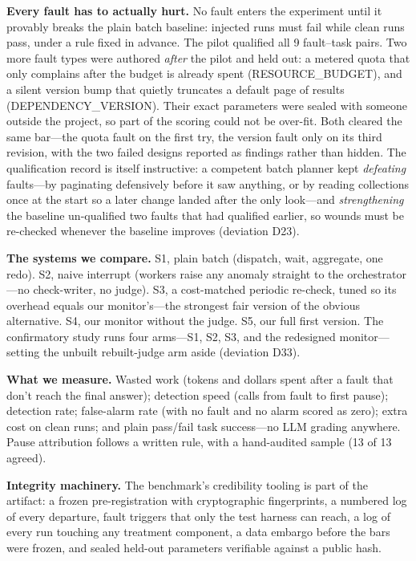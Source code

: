 \documentclass[acmsmall,screen]{acmart}
\begin{document}
\textbf{Every fault has to actually hurt.} No fault enters the experiment until
it provably breaks the plain batch baseline: injected runs must fail while clean
runs pass, under a rule fixed in advance. The pilot qualified all 9 fault--task
pairs. Two more fault types were authored \emph{after} the pilot and held out: a
metered quota that only complains after the budget is already spent
(RESOURCE\_BUDGET), and a silent version bump that quietly truncates a default
page of results (DEPENDENCY\_VERSION). Their exact parameters were sealed with
someone outside the project, so part of the scoring could not be over-fit. Both
cleared the same bar---the quota fault on the first try, the version fault only
on its third revision, with the two failed designs reported as findings rather
than hidden. The qualification record is itself instructive: a competent batch
planner kept \emph{defeating} faults---by paginating defensively before it saw
anything, or by reading collections once at the start so a later change landed
after the only look---and \emph{strengthening} the baseline un-qualified two
faults that had qualified earlier, so wounds must be re-checked whenever the
baseline improves (deviation D23).

\textbf{The systems we compare.} S1, plain batch (dispatch, wait, aggregate,
one redo). S2, naive interrupt (workers raise any anomaly straight to the
orchestrator---no check-writer, no judge). S3, a cost-matched periodic
re-check, tuned so its overhead equals our monitor's---the strongest fair
version of the obvious alternative. S4, our monitor without the judge. S5, our
full first version. The confirmatory study runs four arms---S1, S2, S3, and the
redesigned monitor---setting the unbuilt rebuilt-judge arm aside (deviation
D33).

\textbf{What we measure.} Wasted work (tokens and dollars spent after a fault
that don't reach the final answer); detection speed (calls from fault to first
pause); detection rate; false-alarm rate (with no fault and no alarm scored as
zero); extra cost on clean runs; and plain pass/fail task success---no LLM
grading anywhere. Pause attribution follows a written rule, with a hand-audited
sample (13 of 13 agreed).

\textbf{Integrity machinery.} The benchmark's credibility tooling is part of
the artifact: a frozen pre-registration with cryptographic fingerprints, a
numbered log of every departure, fault triggers that only the test harness can
reach, a log of every run touching any treatment component, a data embargo
before the bars were frozen, and sealed held-out parameters verifiable against a
public hash.
\end{document}
